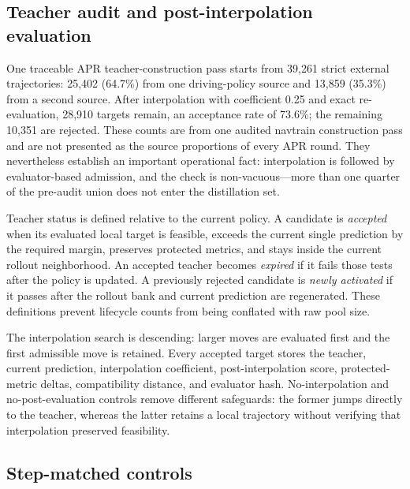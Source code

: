 \subsection{Teacher audit and post-interpolation evaluation}
\label{sec:apr-teacher-audit}

One traceable APR teacher-construction pass starts from 39,261 strict external
trajectories: 25,402 (64.7\%) from one driving-policy source and 13,859
(35.3\%) from a second source.  After interpolation with coefficient 0.25 and
exact re-evaluation, 28,910 targets remain, an acceptance rate of 73.6\%; the
remaining 10,351 are rejected.  These counts are from one audited navtrain
construction pass and are not presented as the source proportions of every
APR round.  They nevertheless establish an important operational fact:
interpolation is followed by evaluator-based admission, and the check is
non-vacuous---more than one quarter of the pre-audit union does not enter the
distillation set.



Teacher status is defined relative to the current policy.  A candidate is
\emph{accepted} when its evaluated local target is feasible, exceeds the
current single prediction by the required margin, preserves protected
metrics, and stays inside the current rollout neighborhood.  An accepted
teacher becomes \emph{expired} if it fails those tests after the policy is
updated.  A previously rejected candidate is \emph{newly activated} if it
passes after the rollout bank and current prediction are regenerated.  These
definitions prevent lifecycle counts from being conflated with raw pool size.

The interpolation search is descending: larger moves are evaluated first and
the first admissible move is retained.  Every accepted target stores the
teacher, current prediction, interpolation coefficient, post-interpolation
score, protected-metric deltas, compatibility distance, and evaluator hash.
No-interpolation and no-post-evaluation controls remove different safeguards:
the former jumps directly to the teacher, whereas the latter retains a local
trajectory without verifying that interpolation preserved feasibility.

\subsection{Step-matched controls}
\label{sec:apr-controls}

